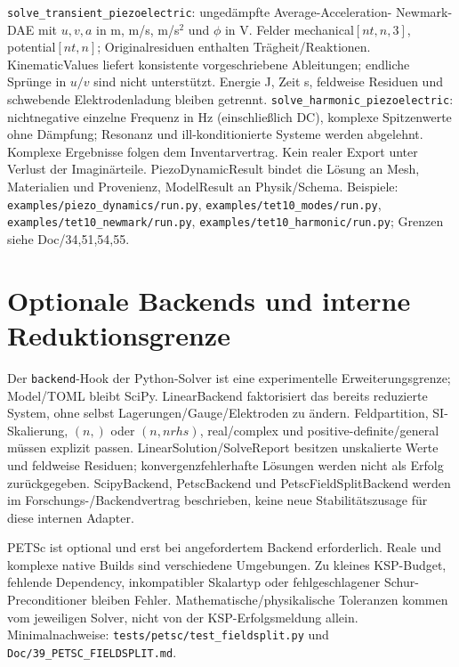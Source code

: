 \texttt{solve\_transient\_piezoelectric}: ungedämpfte Average-Acceleration-
Newmark-DAE mit $u,v,a$ in m, m/s, m/s$^2$ und $\phi$ in V.
Felder mechanical$[nt,n,3]$, potential$[nt,n]$; Originalresiduen enthalten
Trägheit/Reaktionen. KinematicValues liefert konsistente vorgeschriebene
Ableitungen; endliche Sprünge in $u/v$ sind nicht unterstützt. Energie J,
Zeit s, feldweise Residuen und schwebende Elektrodenladung bleiben getrennt.
\texttt{solve\_harmonic\_piezoelectric}: nichtnegative einzelne Frequenz in Hz
(einschließlich DC), komplexe Spitzenwerte ohne Dämpfung; Resonanz und
ill-konditionierte Systeme werden abgelehnt. Komplexe Ergebnisse folgen
dem Inventarvertrag. Kein realer Export unter
Verlust der Imaginärteile. PiezoDynamicResult bindet die Lösung an Mesh,
Materialien und Provenienz, ModelResult an Physik/Schema.
Beispiele: \nolinkurl{examples/piezo_dynamics/run.py},
\nolinkurl{examples/tet10_modes/run.py},
\nolinkurl{examples/tet10_newmark/run.py},
\nolinkurl{examples/tet10_harmonic/run.py}; Grenzen siehe Doc/34,51,54,55.

\section{Optionale Backends und interne Reduktionsgrenze}
Der \texttt{backend}-Hook der Python-Solver ist eine experimentelle
Erweiterungsgrenze; Model/TOML bleibt SciPy. LinearBackend faktorisiert das
bereits reduzierte System, ohne selbst Lagerungen/Gauge/Elektroden zu ändern.
Feldpartition, SI-Skalierung, $(n,)$ oder $(n,nrhs)$, real/complex und
positive-definite/general müssen explizit passen. LinearSolution/SolveReport
besitzen unskalierte Werte und feldweise Residuen; konvergenzfehlerhafte
Lösungen werden nicht als Erfolg zurückgegeben. ScipyBackend, PetscBackend
und PetscFieldSplitBackend werden im Forschungs-/Backendvertrag beschrieben,
keine neue Stabilitätszusage für diese internen Adapter.

PETSc ist optional und erst bei angefordertem Backend erforderlich. Reale und
komplexe native Builds sind verschiedene Umgebungen. Zu kleines KSP-Budget,
fehlende Dependency, inkompatibler Skalartyp oder fehlgeschlagener Schur-
Preconditioner bleiben Fehler. Mathematische/physikalische Toleranzen kommen
vom jeweiligen Solver, nicht von der KSP-Erfolgsmeldung allein.
Minimalnachweise: \nolinkurl{tests/petsc/test_fieldsplit.py}
und \nolinkurl{Doc/39_PETSC_FIELDSPLIT.md}.
\endgroup
